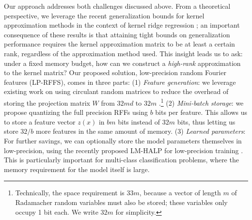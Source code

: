 Our approach addresses both challenges discussed above. From a theoretical perspective, we leverage the recent generalization bounds for kernel approximation methods in the context of kernel ridge regression \citep{avron17,musco17}; an important consequence of these results is that attaining tight bounds on generalization performance requires the kernel approximation matrix to be at least a certain rank, regardless of the approximation method used. This insight leads us to ask: under a fixed memory budget, how can we construct a \textit{high-rank} approximation to the kernel matrix?  Our proposed solution, low-precision random Fourier features (LP-RFFS), comes in three parts: (1)  \textit{Feature generation}: we leverage existing work on using circulant random matrices to reduce the overhead of storing the projection matrix $W$ from $32md$ to $32m$ \citep{yu15}.\footnote{Technically, the space requirement is $33m$, because a vector of length $m$ of Radamacher random variables must also be stored; these variables only occupy 1 bit each. We write $32m$ for simplicity.} (2) \textit{Mini-batch storage}: we propose quantizing the full precision RFFs using $b$ bits per feature. This allows us to store a feature vector $z(x)$ in $bm$ bits instead of $32m$ bits, thus letting us store $32/b$ more features in the same amount of memory. (3) \textit{Learned parameters}: For further savings, we can optionally store the model parameters themselves in low-precision, using the recently proposed LM-HALP for low-precision training \citep{halp18}. This is particularly important for multi-class classification problems, where the memory requirement for the model itself is large.




